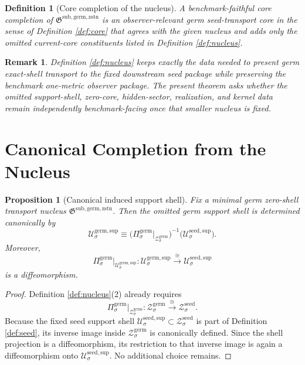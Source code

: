 \documentclass[11pt]{article}
\newcommand{\SeedShell}[1]{\mathcal Z_{#1}^{\mathrm{seed}}}
\newcommand{\SeedSupportShell}[1]{\mathcal U_{#1}^{\mathrm{seed,sup}}}
\newcommand{\GermNucleus}{\mathfrak G^{\mathrm{sub,germ,zstn}}}
\newcommand{\GermProj}[1]{\Pi_{#1}^{\mathrm{germ}}}
\newcommand{\GermShell}[1]{\mathcal Z_{#1}^{\mathrm{germ}}}
\newcommand{\GermSupportShell}[1]{\mathcal U_{#1}^{\mathrm{germ,sup}}}
\newtheorem{definition}{Definition}
\newtheorem{proposition}{Proposition}
\newtheorem{remark}{Remark}
\begin{document}
\begin{definition}[Core completion of the nucleus]
\label{def:completion}
A \emph{benchmark-faithful core completion} of \(\GermNucleus\) is an observer-relevant germ seed-transport core in the sense of Definition \ref{def:core} that agrees with the given nucleus and adds only the omitted current-core constituents listed in Definition \ref{def:nucleus}.
\end{definition}

\begin{remark}
Definition \ref{def:nucleus} keeps exactly the data needed to present germ exact-shell transport to the fixed downstream seed package while preserving the benchmark one-metric observer package. The present theorem asks whether the omitted support-shell, zero-core, hidden-sector, realization, and kernel data remain independently benchmark-facing once that smaller nucleus is fixed.
\end{remark}

\section{Canonical Completion from the Nucleus}

\begin{proposition}[Canonical induced support shell]
\label{prop:support}
Fix a minimal germ zero-shell transport nucleus \(\GermNucleus\). Then the omitted germ support shell is determined canonically by
\[
\GermSupportShell{\sigma}
\equiv
\bigl(\GermProj{\sigma}\big|_{\GermShell{\sigma}}\bigr)^{-1}
\bigl(\SeedSupportShell{\sigma}\bigr).
\]
Moreover,
\[
\GermProj{\sigma}\big|_{\GermSupportShell{\sigma}}
:
\GermSupportShell{\sigma}
\xrightarrow{\cong}
\SeedSupportShell{\sigma}
\]
is a diffeomorphism.
\end{proposition}

\begin{proof}
Definition \ref{def:nucleus}(2) already requires
\[
\GermProj{\sigma}\big|_{\GermShell{\sigma}}
:
\GermShell{\sigma}
\xrightarrow{\cong}
\SeedShell{\sigma}.
\]
Because the fixed seed support shell \(\SeedSupportShell{\sigma}\subset\SeedShell{\sigma}\) is part of Definition \ref{def:seed}, its inverse image inside \(\GermShell{\sigma}\) is canonically defined. Since the shell projection is a diffeomorphism, its restriction to that inverse image is again a diffeomorphism onto \(\SeedSupportShell{\sigma}\). No additional choice remains.
\end{proof}
\end{document}
